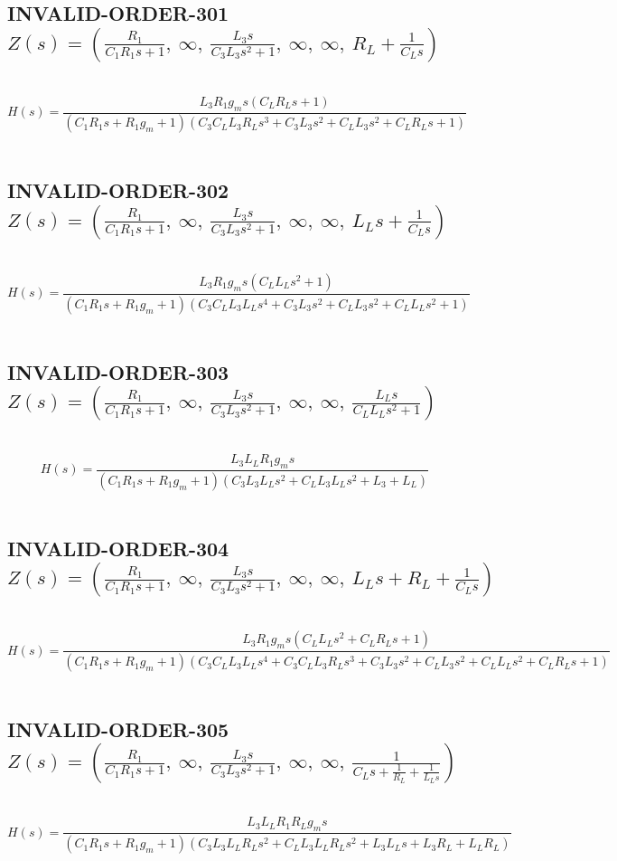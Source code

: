 \documentclass{article}
\begin{document}
\subsection{INVALID-ORDER-301 $Z(s) = \left( \frac{R_{1}}{C_{1} R_{1} s + 1}, \  \infty, \  \frac{L_{3} s}{C_{3} L_{3} s^{2} + 1}, \  \infty, \  \infty, \  R_{L} + \frac{1}{C_{L} s}\right)$ } \ 
\textbf{\[H(s) = \frac{L_{3} R_{1} g_{m} s \left(C_{L} R_{L} s + 1\right)}{\left(C_{1} R_{1} s + R_{1} g_{m} + 1\right) \left(C_{3} C_{L} L_{3} R_{L} s^{3} + C_{3} L_{3} s^{2} + C_{L} L_{3} s^{2} + C_{L} R_{L} s + 1\right)}\] } \ 
\subsection{INVALID-ORDER-302 $Z(s) = \left( \frac{R_{1}}{C_{1} R_{1} s + 1}, \  \infty, \  \frac{L_{3} s}{C_{3} L_{3} s^{2} + 1}, \  \infty, \  \infty, \  L_{L} s + \frac{1}{C_{L} s}\right)$ } \ 
\textbf{\[H(s) = \frac{L_{3} R_{1} g_{m} s \left(C_{L} L_{L} s^{2} + 1\right)}{\left(C_{1} R_{1} s + R_{1} g_{m} + 1\right) \left(C_{3} C_{L} L_{3} L_{L} s^{4} + C_{3} L_{3} s^{2} + C_{L} L_{3} s^{2} + C_{L} L_{L} s^{2} + 1\right)}\] } \ 
\subsection{INVALID-ORDER-303 $Z(s) = \left( \frac{R_{1}}{C_{1} R_{1} s + 1}, \  \infty, \  \frac{L_{3} s}{C_{3} L_{3} s^{2} + 1}, \  \infty, \  \infty, \  \frac{L_{L} s}{C_{L} L_{L} s^{2} + 1}\right)$ } \ 
\textbf{\[H(s) = \frac{L_{3} L_{L} R_{1} g_{m} s}{\left(C_{1} R_{1} s + R_{1} g_{m} + 1\right) \left(C_{3} L_{3} L_{L} s^{2} + C_{L} L_{3} L_{L} s^{2} + L_{3} + L_{L}\right)}\] } \ 
\subsection{INVALID-ORDER-304 $Z(s) = \left( \frac{R_{1}}{C_{1} R_{1} s + 1}, \  \infty, \  \frac{L_{3} s}{C_{3} L_{3} s^{2} + 1}, \  \infty, \  \infty, \  L_{L} s + R_{L} + \frac{1}{C_{L} s}\right)$ } \ 
\textbf{\[H(s) = \frac{L_{3} R_{1} g_{m} s \left(C_{L} L_{L} s^{2} + C_{L} R_{L} s + 1\right)}{\left(C_{1} R_{1} s + R_{1} g_{m} + 1\right) \left(C_{3} C_{L} L_{3} L_{L} s^{4} + C_{3} C_{L} L_{3} R_{L} s^{3} + C_{3} L_{3} s^{2} + C_{L} L_{3} s^{2} + C_{L} L_{L} s^{2} + C_{L} R_{L} s + 1\right)}\] } \ 
\subsection{INVALID-ORDER-305 $Z(s) = \left( \frac{R_{1}}{C_{1} R_{1} s + 1}, \  \infty, \  \frac{L_{3} s}{C_{3} L_{3} s^{2} + 1}, \  \infty, \  \infty, \  \frac{1}{C_{L} s + \frac{1}{R_{L}} + \frac{1}{L_{L} s}}\right)$ } \ 
\textbf{\[H(s) = \frac{L_{3} L_{L} R_{1} R_{L} g_{m} s}{\left(C_{1} R_{1} s + R_{1} g_{m} + 1\right) \left(C_{3} L_{3} L_{L} R_{L} s^{2} + C_{L} L_{3} L_{L} R_{L} s^{2} + L_{3} L_{L} s + L_{3} R_{L} + L_{L} R_{L}\right)}\] } \ 
\end{document}
